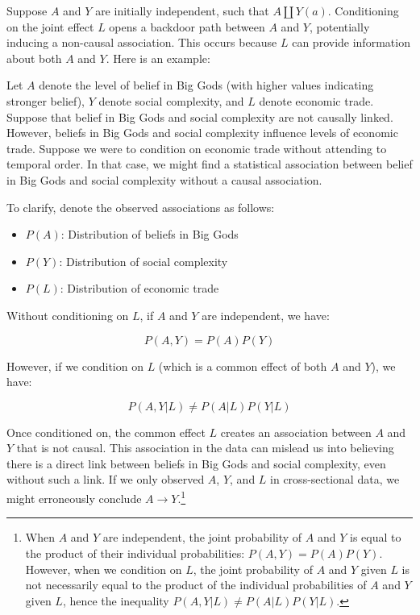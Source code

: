 \documentclass[
  singlecolumn]{report}
\providecommand{\tightlist}{%
  \setlength{\itemsep}{0pt}\setlength{\parskip}{0pt}}\usepackage{longtable,booktabs,array}
\begin{document}
Suppose \(A\) and \(Y\) are initially independent, such that
\(A \coprod Y(a)\). Conditioning on the joint effect \(L\) opens a
backdoor path between \(A\) and \(Y\), potentially inducing a non-causal
association. This occurs because \(L\) can provide information about
both \(A\) and \(Y\). Here is an example:

Let \(A\) denote the level of belief in Big Gods (with higher values
indicating stronger belief), \(Y\) denote social complexity, and \(L\)
denote economic trade. Suppose that belief in Big Gods and social
complexity are not causally linked. However, beliefs in Big Gods and
social complexity influence levels of economic trade. Suppose we were to
condition on economic trade without attending to temporal order. In that
case, we might find a statistical association between belief in Big Gods
and social complexity without a causal association.

To clarify, denote the observed associations as follows:

\begin{itemize}
\tightlist
\item
  \(P(A)\): Distribution of beliefs in Big Gods
\item
  \(P(Y)\): Distribution of social complexity
\item
  \(P(L)\): Distribution of economic trade
\end{itemize}

Without conditioning on \(L\), if \(A\) and \(Y\) are independent, we
have:

\[P(A, Y) = P(A)P(Y)\]

However, if we condition on \(L\) (which is a common effect of both
\(A\) and \(Y\)), we have:

\[P(A, Y | L) \neq P(A | L)P(Y | L)\]

Once conditioned on, the common effect \(L\) creates an association
between \(A\) and \(Y\) that is not causal. This association in the data
can mislead us into believing there is a direct link between beliefs in
Big Gods and social complexity, even without such a link. If we only
observed \(A\), \(Y\), and \(L\) in cross-sectional data, we might
erroneously conclude \(A \to Y\).\footnote{When \(A\) and \(Y\) are
  independent, the joint probability of \(A\) and \(Y\) is equal to the
  product of their individual probabilities: \(P(A, Y) = P(A)P(Y)\).
  However, when we condition on \(L\), the joint probability of \(A\)
  and \(Y\) given \(L\) is not necessarily equal to the product of the
  individual probabilities of \(A\) and \(Y\) given \(L\), hence the
  inequality \(P(A, Y | L) \neq P(A | L)P(Y | L)\).}
\end{document}
